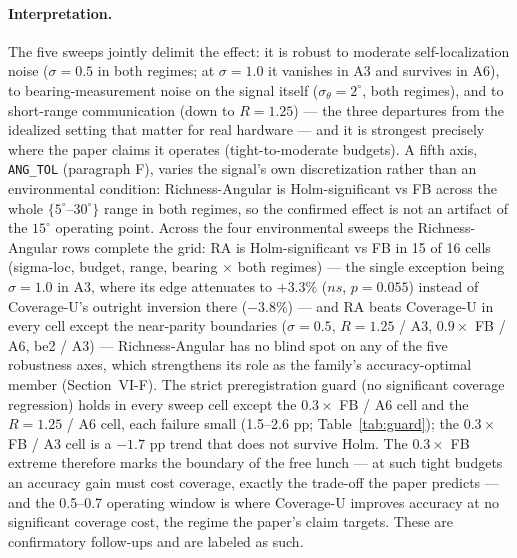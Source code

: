 \documentclass[journal]{IEEEtran}
\newcommand{\CU}{Coverage-U}
\newcommand{\RA}{Richness-Angular}
\begin{document}
\paragraph{Interpretation.}
The five sweeps jointly delimit the effect: it is robust to moderate
self-localization noise ($\sigma = 0.5$ in both regimes; at $\sigma = 1.0$ it
vanishes in A3 and survives in A6), to bearing-measurement noise on the signal
itself ($\sigma_\theta = 2^\circ$, both regimes), and to short-range
communication (down to $R = 1.25$) --- the three departures from the idealized
setting that matter for real hardware --- and it is strongest precisely where
the paper claims it operates (tight-to-moderate budgets). A fifth axis,
\texttt{ANG\_TOL} (paragraph F), varies the signal's own discretization rather
than an environmental condition: \RA{} is Holm-significant vs FB across the
whole $\{5^\circ$--$30^\circ\}$ range in both regimes, so the confirmed effect
is not an artifact of the $15^\circ$ operating point. Across the four
environmental sweeps the \RA{} rows complete the grid: RA is
Holm-significant vs FB in 15 of
16 cells (sigma-loc, budget, range, bearing $\times$ both regimes) --- the
single exception being $\sigma = 1.0$ in A3, where its edge attenuates to
$+3.3\%$ ($ns$, $p = 0.055$) instead of \CU's{} outright inversion there
($-3.8\%$) --- and RA
beats \CU{} in every cell except the near-parity boundaries ($\sigma = 0.5$,
$R = 1.25$ / A3, $0.9\times$ FB / A6, be2 / A3) --- \RA{} has no blind spot on
any of the five robustness axes, which strengthens its role as the family's
accuracy-optimal member (Section~VI-F). The strict
preregistration guard (no significant coverage regression) holds in every sweep
cell except the $0.3\times$ FB / A6 cell and the $R = 1.25$ / A6 cell, each
failure small (1.5--2.6 pp; Table~\ref{tab:guard}); the $0.3\times$ FB / A3 cell
is a $-1.7$ pp trend that does not survive Holm. The $0.3\times$ FB extreme
therefore marks the boundary of the free lunch --- at such tight budgets an
accuracy gain must cost coverage, exactly the trade-off the paper predicts ---
and the 0.5--0.7 operating window is where \CU{} improves accuracy at no
significant coverage cost, the regime the paper's claim targets. These are
confirmatory follow-ups and are labeled as such.
\end{document}
